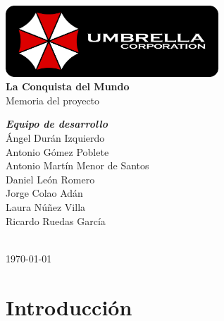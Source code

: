 \documentclass[a4paper,11pt,oneside]{report}
\begin{document}
\renewcommand\listtablename{Índice de tablas}
\renewcommand\tablename{Tabla}

\pagestyle{plain}



\begin{titlepage}
\begin{center}

\includegraphics[width=0.6\textwidth]{logo-umbrella.png}\\[4cm]

{\huge \textbf{La Conquista del Mundo}}\\[0.5cm]
{\huge {Memoria del proyecto}}\\[4cm]

\begin{minipage}{0.5\textwidth}
\large
\hspace{1cm}\textbf{\emph{Equipo de desarrollo}}\\
Ángel Durán Izquierdo\\
Antonio Gómez Poblete\\
Antonio Martín Menor de Santos\\
Daniel León Romero\\
Jorge Colao Adán\\
Laura Núñez Villa\\
Ricardo Ruedas García\\
\end{minipage}\\[2cm]

{\Large \today}
\end{center}
\end{titlepage}


\clearpage
{}
\setcounter{page}{2}

\tableofcontents
{}

\clearpage

\pagestyle{fancy}

\chapter{Introducción}
\end{document}
